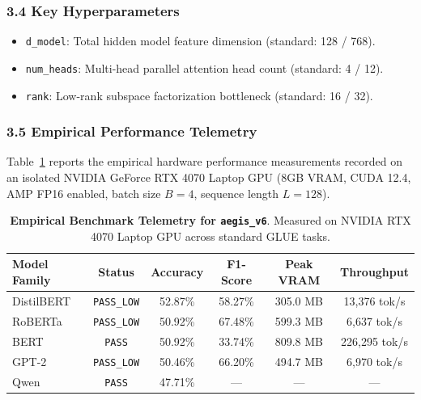 \subsubsection*{3.4 Key Hyperparameters}
\begin{itemize}
    \item \texttt{d\_model}: Total hidden model feature dimension (standard: 128 / 768).
    \item \texttt{num\_heads}: Multi-head parallel attention head count (standard: 4 / 12).
    \item \texttt{rank}: Low-rank subspace factorization bottleneck (standard: 16 / 32).
\end{itemize}

\subsubsection*{3.5 Empirical Performance Telemetry}
Table~\ref{tab:telemetry_aegis_v6} reports the empirical hardware performance measurements recorded on an isolated NVIDIA GeForce RTX 4070 Laptop GPU (8GB VRAM, CUDA 12.4, AMP FP16 enabled, batch size $B=4$, sequence length $L=128$).

\begin{table}[h]
\centering
\small
\caption{\textbf{Empirical Benchmark Telemetry for \texttt{aegis\_v6}}. Measured on NVIDIA RTX 4070 Laptop GPU across standard GLUE tasks.}
\label{tab:telemetry_aegis_v6}
\begin{tabular*}{\columnwidth}{@{\extracolsep{\fill}}lccccc}
\toprule
\textbf{Model Family} & \textbf{Status} & \textbf{Accuracy} & \textbf{F1-Score} & \textbf{Peak VRAM} & \textbf{Throughput} \\
\midrule
DistilBERT & \texttt{PASS\_LOW} & 52.87\% & 58.27\% & 305.0 MB & 13,376 tok/s \\
RoBERTa & \texttt{PASS\_LOW} & 50.92\% & 67.48\% & 599.3 MB & 6,637 tok/s \\
BERT & \texttt{PASS} & 50.92\% & 33.74\% & 809.8 MB & 226,295 tok/s \\
GPT-2 & \texttt{PASS\_LOW} & 50.46\% & 66.20\% & 494.7 MB & 6,970 tok/s \\
Qwen & \texttt{PASS} & 47.71\% & --- & --- & --- \\
\bottomrule
\end{tabular*}
\end{table}

